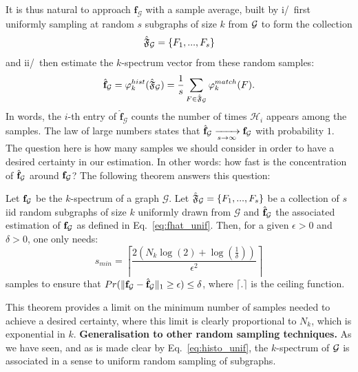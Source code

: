 It is thus natural to approach $\mathbf{f}_\mathcal{G}$ with a sample average, built by i/~first uniformly sampling at random $s$ subgraphs of size $k$ from $\mathcal{G}$ to form the collection 
$$\hat{\mathfrak{F}}_{\mathcal{G}}=\{F_1,...,F_s\}$$
and ii/~then estimate the $k$-spectrum vector from these random samples:
\begin{align}
	\label{eq:fhat_unif}
	\hat{\mathbf{f}}_\mathcal{G} = \varphi_k^{hist}(\hat{\mathfrak{F}}_{\mathcal{G}})= \frac{1}{s}\sum_{F\in\hat{\mathfrak{F}}_{\mathcal{G}}} \varphi^{match}_k(F).
\end{align}
In words, the $i$-th entry of $\hat{\mathbf{f}}_\mathcal{G}$ counts the number of times $\mathcal{H}_i$ appears among the samples. 
The law of large numbers states that $\hat{\mathbf{f}}_{\mathcal{G}} \xrightarrow[s \to \infty]{} \mathbf{f}_\mathcal{G}$ with probability $1$.
The question here is how many samples we should consider in order to have a desired certainty in our estimation. In other words: how fast is the concentration of $\hat{\mathbf{f}}_{\mathcal{G}}$ around $\mathbf{f}_{\mathcal{G}}$? The following theorem answers this question:%
\begin{theorem}
	\label{thm:norm1}
	Let $\mathbf{f}_{\mathcal{G}}$ be the $k$-spectrum of a graph $\mathcal{G}$. Let $\hat{\mathfrak{F}}_{\mathcal{G}}=\{F_1,...,F_{s}\}$ be a collection of $s$ iid random subgraphs of size $k$ uniformly drawn from $\mathcal{G}$ and $\hat{\mathbf{f}}_{\mathcal{G}}$ the associated estimation of $\mathbf{f}_{\mathcal{G}}$ as defined in Eq.~\eqref{eq:fhat_unif}. Then, for a given $\epsilon>0$ and $\delta >0$, one only needs:
	\begin{equation}
	s_{min}=\left \lceil \frac{2(N_k\log(2)+\log(\frac{1}{\delta} ))}{\epsilon^2} \right \rceil
	\end{equation}
	samples to ensure that $Pr(\| \mathbf{f}_{\mathcal{G}}-\hat{\mathbf{f}}_\mathcal{G} \|_1 \geq \epsilon )\leq\delta$, where $\lceil.\rceil$ is the ceiling function.
\end{theorem}
This theorem provides a limit on the minimum number of samples needed to achieve a desired certainty, where this limit is clearly proportional to $N_k$, which is exponential in $k$.
\noindent\textbf{Generalisation to other random sampling techniques.} As we have seen, and as is made clear by Eq.~\eqref{eq:histo_unif}, the $k$-spectrum of $\mathcal{G}$ is associated in a sense to uniform random sampling of subgraphs. 

